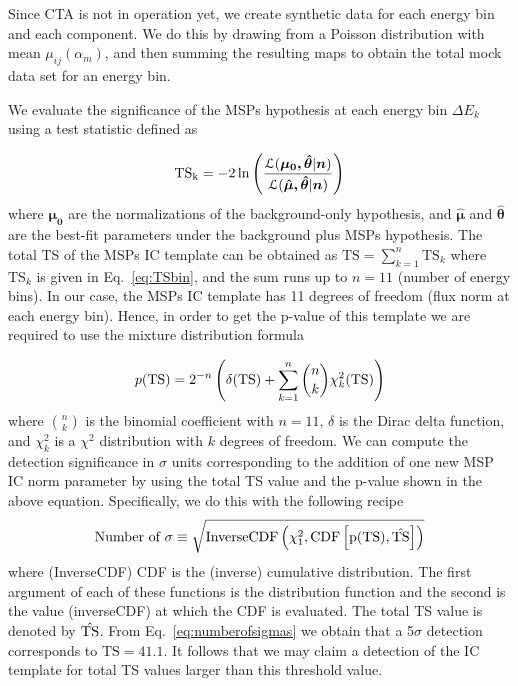\documentclass[doublespace,nopageskip]{VTthesis}
\begin{document}
Since CTA is not in operation yet, we create synthetic data for each energy bin and each component. We do this by drawing from a Poisson distribution with mean $\mu_{ij}(\alpha_m)$, and then summing the resulting maps to obtain the total mock data set for an energy bin.

We evaluate the significance of the MSPs hypothesis at each energy bin $\Delta E_k$ using a test statistic defined as

\begin{equation}\label{eq:TSbin}
    {\rm TS_k} = -2\ln{\left(\frac{\mathcal{L}(\boldsymbol{\mu_0, \hat{\theta}}\lvert \boldsymbol{n})}{\mathcal{L}(\boldsymbol{\hat{\mu}, \hat{\theta}}\lvert \boldsymbol{n})}\right)}
\end{equation}
where $\boldsymbol{\mu_0}$ are the normalizations of the background-only hypothesis, and $\boldsymbol{\hat{\mu}}$ and $\boldsymbol{\hat{\theta}}$ are the best-fit parameters under the background plus MSPs hypothesis. The total TS of the MSPs IC template can be obtained as $\mbox{TS}=\sum_{k=1}^n \mbox{TS}_k$ where $\mbox{TS}_k$ is given in Eq.~\ref{eq:TSbin}, and the sum runs up to $n=11$ (number of energy bins). In our case, the MSPs IC template has 11 degrees of freedom (flux norm at each energy bin). Hence, in order to get the p-value of this template we are required to use the mixture distribution formula~\citep{2018NatAs...2..387M}

\begin{equation}\label{eq:pvalue}
p({\rm TS})= 2^{-n}\left(\delta({\rm TS}) +\sum_{k=1}^{n} \binom{n}{k} \chi_{k}^2({\rm TS})\right)
\end{equation}
where $\binom{n}{k}$ is the binomial coefficient with $n=11$, $\delta$ is the Dirac delta function, and $\chi_{k}^2$ is a $\chi^2$ distribution with $k$ degrees of freedom. We can compute the detection significance in $\sigma$ units  
corresponding to the addition of one new MSP IC norm parameter
by using the total TS value and the p-value shown in the above equation. Specifically, we do this with the following recipe~\citep{2018NatAs...2..387M}
\begin{equation}\label{eq:numberofsigmas}
\mbox{Number of $\sigma$}\equiv \sqrt{\rm InverseCDF\left(\chi_1^2,{\rm CDF}\left[p(\mbox{TS}),\hat{{\rm TS}}\right]\right)}
\end{equation}
where (InverseCDF) CDF is the (inverse) cumulative distribution. The first argument of each of these functions is the distribution function and the second is the value (inverseCDF) at which the CDF is evaluated. 
The total TS value is denoted by $\hat{\rm TS}$. From Eq.~\ref{eq:numberofsigmas} we obtain that a 5$\sigma$ detection corresponds to $\mbox{TS}=41.1$. It follows that we may  
claim a detection of the IC template for total TS values larger than this threshold value.
\end{document}
